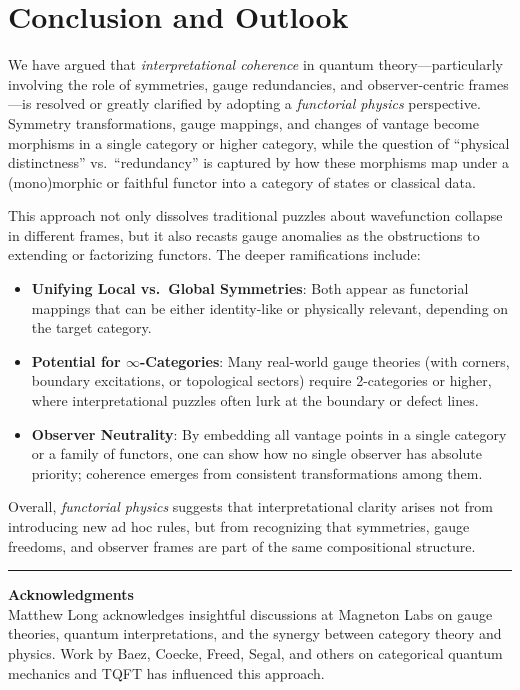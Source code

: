\documentclass[12pt]{article}
\begin{document}
\section{Conclusion and Outlook}
\label{sec:Conclusion}
We have argued that \emph{interpretational coherence} in quantum theory---particularly involving 
the role of symmetries, gauge redundancies, and observer-centric frames---is resolved or greatly 
clarified by adopting a \emph{functorial physics} perspective. Symmetry transformations, gauge 
mappings, and changes of vantage become morphisms in a single category or higher category, while 
the question of “physical distinctness” vs.\ “redundancy” is captured by how these morphisms 
map under a (mono)morphic or faithful functor into a category of states or classical data.

This approach not only dissolves traditional puzzles about wavefunction collapse in different 
frames, but it also recasts gauge anomalies as the obstructions to extending or factorizing 
functors. The deeper ramifications include:
\begin{itemize}[label=$\bullet$]
    \item \textbf{Unifying Local vs.\ Global Symmetries}: Both appear as functorial mappings that 
    can be either identity-like or physically relevant, depending on the target category.
    \item \textbf{Potential for $\infty$-Categories}: Many real-world gauge theories (with corners, 
    boundary excitations, or topological sectors) require 2-categories or higher, where interpretational 
    puzzles often lurk at the boundary or defect lines.
    \item \textbf{Observer Neutrality}: By embedding all vantage points in a single category 
    or a family of functors, one can show how no single observer has absolute priority; 
    coherence emerges from consistent transformations among them.
\end{itemize}

Overall, \emph{functorial physics} suggests that interpretational clarity arises not from 
introducing new ad hoc rules, but from recognizing that symmetries, gauge freedoms, 
and observer frames are part of the same compositional structure.

\vspace{1em}
\hrule
\vspace{1em}

\noindent \textbf{Acknowledgments} \\
Matthew Long acknowledges insightful discussions at Magneton Labs on gauge theories, 
quantum interpretations, and the synergy between category theory and physics. Work 
by Baez, Coecke, Freed, Segal, and others on categorical quantum mechanics and TQFT 
has influenced this approach.
\end{document}
